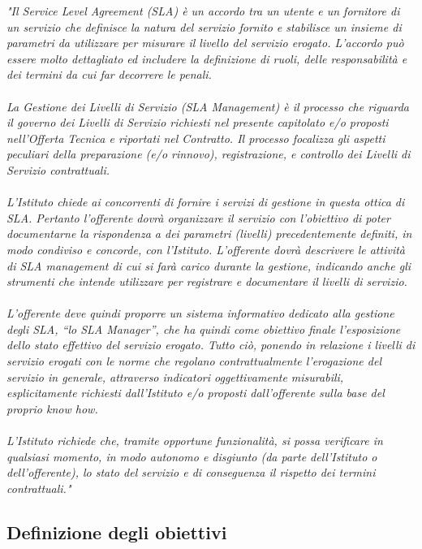 \textit{"Il Service Level Agreement (SLA) è un accordo tra un utente e un fornitore di un servizio che definisce la natura del servizio fornito e stabilisce un insieme di parametri da utilizzare per misurare il livello del servizio erogato. L’accordo può essere molto dettagliato ed includere la definizione di ruoli, delle responsabilità e dei termini da cui far decorrere le penali. 
\\ \\
La Gestione dei Livelli di Servizio (SLA Management) è il processo che riguarda il governo dei Livelli di Servizio richiesti nel presente capitolato e/o proposti nell’Offerta Tecnica e riportati nel Contratto. Il processo focalizza gli aspetti peculiari della preparazione (e/o rinnovo), registrazione, e controllo dei Livelli di Servizio contrattuali.
\\ \\
L’Istituto chiede ai concorrenti di fornire i servizi di gestione in questa ottica di SLA. Pertanto l’offerente dovrà organizzare il servizio con l’obiettivo di poter documentarne la rispondenza a dei parametri (livelli) precedentemente definiti, in modo condiviso e concorde, con l’Istituto. L’offerente dovrà descrivere le attività di SLA management di cui si farà carico durante la gestione, indicando anche gli strumenti che intende utilizzare per registrare e documentare il livelli di servizio.
\\ \\
L’offerente deve quindi proporre un sistema informativo dedicato alla gestione degli SLA, “lo SLA Manager”, che ha quindi come obiettivo finale l’esposizione dello stato effettivo del servizio erogato. Tutto ciò, ponendo in relazione i livelli di servizio erogati con le norme che regolano contrattualmente l’erogazione del servizio in generale, attraverso indicatori oggettivamente misurabili, esplicitamente richiesti dall’Istituto e/o proposti dall’offerente sulla base del proprio know how.
\\ \\
L’Istituto richiede che, tramite opportune funzionalità, si possa verificare in qualsiasi momento, in modo autonomo e disgiunto (da parte dell’Istituto o dell’offerente), lo stato del servizio e di conseguenza il rispetto dei termini contrattuali."}

\subsection{Definizione degli obiettivi}

